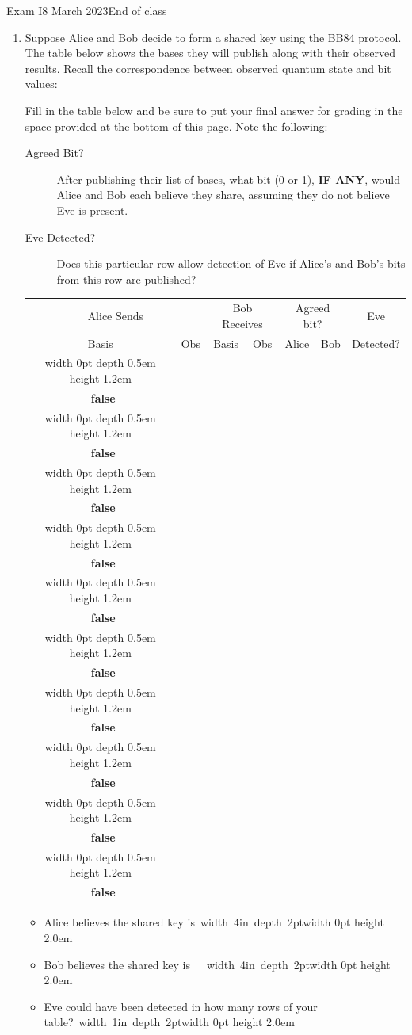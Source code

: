 \documentclass[12pt]{article}
\def\Obox#1{\Ovalbox{\hbox to 1ex{\vrule width 0pt height 1ex\hss #1\hss}}}
\def\TFMarked#1#2{\ \stackbox[l][m]{\Obox{#1}~\textbf{true}\\\Obox{#2}~\textbf{false}}}
\def\TF{\TFMarked{\relax}{\relax}}
\newcommand{\Blank}[1][1in]{\mbox{\vrule width #1 depth 2pt}\vrule width 0pt height 2.0em}
\begin{document}
\begin{assignment}{Exam I}{8 March 2023}{End of class}
\begin{enumerate}
\clearpage\item{}  Suppose Alice and Bob decide to form a shared key using the BB84 protocol.  The table below shows the bases they will publish along with their observed results.   Recall the correspondence between observed quantum state and bit values:
\begin{BBKey}
\begin{center}
\BBBasis{}
\end{center}
\end{BBKey}
\def\RowU#1#2#3#4{%
\vrule width 0pt depth 0.5em height 1.2em#1 &#2 & #3 & #4 & & & {\vrule width 0pt depth 13pt\small\TF{}}  \\ \hline}
\def\Row#1#2#3{%
\RowU{\STD}{#1}{#2}{#3}}
\def\RowX#1#2#3{%
\RowU{\HDM}{#1}{#2}{#3}}

Fill in the table below and be sure to put your final answer for grading in the space provided at the bottom of this page.  Note the following:
\begin{description}
  \item[Agreed Bit?]  After publishing their list of bases, what bit (0 or 1), \textbf{IF ANY}, would Alice and Bob each believe they share, assuming they do not believe Eve is present.
  \item[Eve Detected?] Does this particular row allow detection of Eve if Alice's and Bob's bits from this row are published?
\end{description}

\begin{BBKey}
\begin{center}\large
\begin{tabular}{c|c||c|c||c|c||c}
\multicolumn{2}{c||}{Alice Sends} & \multicolumn{2}{c||}{Bob Receives}& \multicolumn{2}{c||}{Agreed bit?}&Eve \\
Basis & Obs & Basis & Obs & Alice & Bob & Detected?\\\hline
\RowX{\BBNe}{\HDM}{\BBNe}
\Row{\BBUp}{\STD}{\BBUp}
\RowX{\BBNe}{\HDM}{\BBSe}
\Row{\BBRt}{\STD}{\BBRt}
\Row{\BBUp}{\HDM}{\BBNe}
\Row{\BBUp}{\STD}{\BBUp}\Row{\BBRt}{\HDM}{\BBSe}
\RowX{\BBSe}{\HDM}{\BBSe}
\Row{\BBRt}{\STD}{\BBLt}
\RowX{\BBNe}{\HDM}{\BBNe}

\end{tabular}
\end{center}
\end{BBKey}
\begin{itemize}
    \item Alice believes the shared key is~\Blank[4in]{}
    \item Bob believes the shared key is\ \ ~\Blank[4in]{}
    \item Eve could have been detected in how many rows of your table?~\Blank{}
\end{itemize}


\end{enumerate}
\end{assignment}
\end{document}
